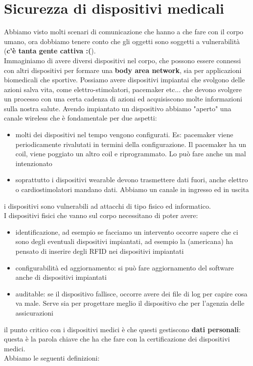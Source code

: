 \documentclass[oneside, 12pt]{extbook}
\begin{document}
\section{Sicurezza di dispositivi medicali}
Abbiamo visto molti scenari di comunicazione che hanno a che fare con il corpo umano, ora dobbiamo tenere conto che gli oggetti sono soggetti a vulnerabilità (\textsf{\textbf{c'è  tanta gente cattiva :(}}).\\Immaginiamo di avere diversi dispositivi nel corpo, che possono essere connessi con altri dispositivi per formare una \textbf{body area network}, sia per applicazioni biomedicali che sportive. Possiamo avere dispositivi impiantai che svolgono delle azioni salva vita, come elettro-stimolatori, pacemaker etc... che devono svolgere un processo con una certa cadenza di azioni ed acquisiscono molte informazioni sulla nostra salute. Avendo impiantato un dispositivo abbiamo "aperto" una canale wireless che è fondamentale per due aspetti:
\begin{itemize}
	\item molti dei dispositivi nel tempo vengono configurati. Es: pacemaker viene periodicamente rivalutati in termini della configurazione. Il pacemaker ha un coil, viene poggiato un altro coil e riprogrammato. Lo può fare anche un mal intenzionato
	\item soprattutto i dispositivi wearable devono trasmettere dati fuori, anche elettro o cardiostimolatori mandano dati. Abbiamo un canale in ingresso ed in uscita
\end{itemize}
i dispositivi sono vulnerabili ad attacchi di tipo fisico ed informatico.\\I dispositivi fisici che vanno sul corpo necessitano di poter avere:
\begin{itemize}
	\item identificazione, ad esempio se facciamo un intervento occorre sapere che ci sono degli eventuali dispositivi impiantati, ad esempio la (americana) ha pensato di inserire degli RFID nei dispositivi impiantati
	\item configurabilità ed aggiornamento: si può fare aggiornamento del software anche di dispositivi impiantati
	\item auditable: se il dispositivo fallisce, occorre avere dei file di log per capire cosa va male. Serve sia per progettare meglio il dispositivo che per l'agenzia delle assicurazioni
\end{itemize}
il punto critico con i dispositivi medici è che questi gestiscono \textbf{dati personali}: questa è la parola chiave che ha che fare con la certificazione dei dispositivi medici.\\Abbiamo le seguenti definizioni:
\end{document}
